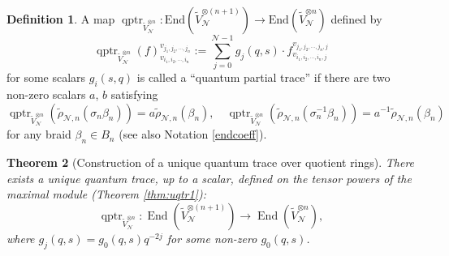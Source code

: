\documentclass[reqno,a4paper,11pt]{amsart}
\numberwithin{equation}{section}
\numberwithin{figure}{section}
\theoremstyle{definition}
\newtheorem{defn}{Definition}[section]
\theoremstyle{plain}
\newtheorem{thm}[defn]{Theorem}
\newcommand{\qptr}{\operatorname{qptr}}
\newcommand{\End}{\mathrm{End}}
\newcommand{\cN}{\mathcal{N}}
\begin{document}
\begin{defn}
A map $\qptr_{\widetilde{V}_{\cN}^{\otimes n}} : \End(\widetilde{V}_{\cN}^{\otimes (n+1)})\to \End(\widetilde{V}_{\cN}^{\otimes n})$
defined by
\[
\qptr_{\widetilde{V}_{\cN}^{\otimes n}}(f)_{v_{i_1,i_2, \cdots, i_n}}^{v_{j_1,j_2, \cdots, j_n}}
:=\sum_{j=0}^{\cN-1}
g_j(q, s) \cdot f_{v_{i_1,i_2, \cdots, i_n,j}}^{v_{j_1,j_2, \cdots, j_n,j}}
\]
for some scalars $g_i(s, q)$
 is called a ``quantum partial trace'' if there are two non-zero scalars $a$, $b$ satisfying
%
\begin{equation}
\qptr_{\widetilde{V}_{\cN}^{\otimes n}}(\widetilde\rho_{\cN,n}(\sigma_n\beta_n)) 
=
a \widetilde\rho_{\cN,n}(\beta_n), 
\quad
\qptr_{\widetilde{V}_{\cN}^{\otimes n}}(\widetilde\rho_{\cN,n}(\sigma_n^{-1}\beta_n) )
=
a^{-1} \widetilde\rho_{\cN,n}(\beta_n)
\end{equation}
 for any braid $\beta_n \in B_n$ {(see also Notation \ref{endcoeff})}.  
\end{defn}

  \begin{thm}[Construction of a unique quantum trace over quotient rings]

There exists a unique quantum trace, up to a scalar, defined on the tensor powers of the maximal module (Theorem \ref{thm:uqtr1}):
$$
\qptr_{\widetilde{V}_{\cN}^{\otimes n}}:\operatorname{End}(\widetilde{V}_{\cN}^{\otimes (n+1)})\rightarrow \operatorname{End}(\widetilde{V}_{\cN}^{\otimes n}),
$$ 
where $g_j(q, s) = g_0(q, s) q^{-2j}$ for some non-zero $g_0(q, s)$.  
\end{thm}
\end{document}
